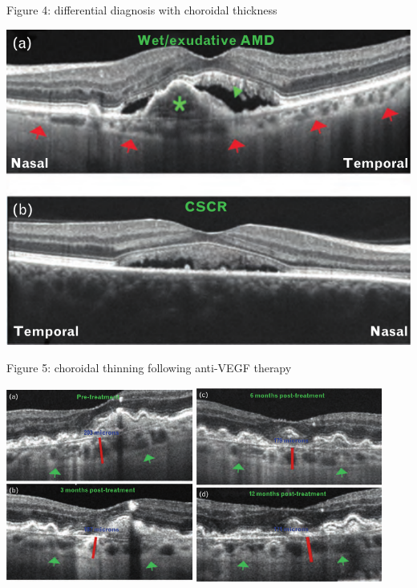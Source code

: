 \documentclass{beamer}
\begin{document}
\begin{frame}{Figure 4: differential diagnosis with choroidal thickness}
    \begin{center}
        \includegraphics[height=0.8\textheight]{4.png}
    \end{center}
\end{frame}

\begin{frame}{Figure 5: choroidal thinning following anti-VEGF therapy}
    \begin{center}
        \includegraphics[width=0.46\textwidth]{5a.png}
        \quad
        \includegraphics[width=0.46\textwidth]{5c.png}
    \end{center}
\end{frame}
\end{document}
